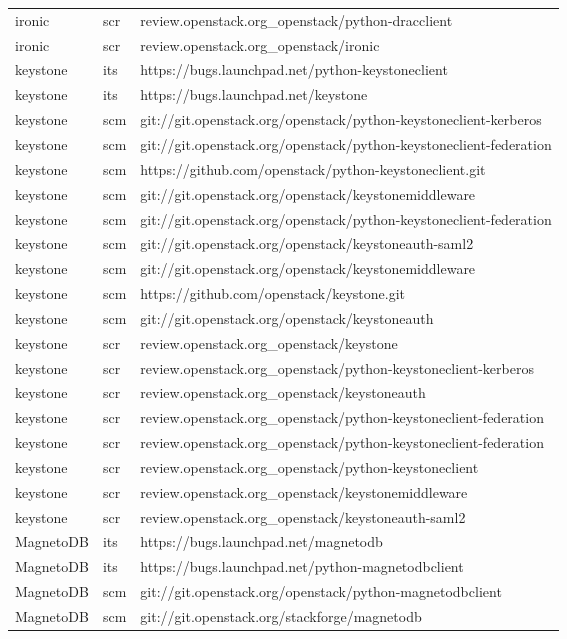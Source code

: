 \begin{center}
\begin{longtable}{|p{4cm}|p{1cm}|p{10cm}|}
ironic&scr&review.openstack.org\_openstack/python-dracclient\\ 
ironic&scr&review.openstack.org\_openstack/ironic\\ 
keystone&its&https://bugs.launchpad.net/python-keystoneclient\\ 
keystone&its&https://bugs.launchpad.net/keystone\\ 
keystone&scm&git://git.openstack.org/openstack/python-keystoneclient-kerberos\\ 
keystone&scm&git://git.openstack.org/openstack/python-keystoneclient-federation\\ 
keystone&scm&https://github.com/openstack/python-keystoneclient.git\\ 
keystone&scm&git://git.openstack.org/openstack/keystonemiddleware\\ 
keystone&scm&git://git.openstack.org/openstack/python-keystoneclient-federation\\ 
keystone&scm&git://git.openstack.org/openstack/keystoneauth-saml2\\ 
keystone&scm&git://git.openstack.org/openstack/keystonemiddleware\\ 
keystone&scm&https://github.com/openstack/keystone.git\\ 
keystone&scm&git://git.openstack.org/openstack/keystoneauth\\ 
keystone&scr&review.openstack.org\_openstack/keystone\\ 
keystone&scr&review.openstack.org\_openstack/python-keystoneclient-kerberos\\ 
keystone&scr&review.openstack.org\_openstack/keystoneauth\\ 
keystone&scr&review.openstack.org\_openstack/python-keystoneclient-federation\\ 
keystone&scr&review.openstack.org\_openstack/python-keystoneclient-federation\\ 
keystone&scr&review.openstack.org\_openstack/python-keystoneclient\\ 
keystone&scr&review.openstack.org\_openstack/keystonemiddleware\\ 
keystone&scr&review.openstack.org\_openstack/keystoneauth-saml2\\ 
MagnetoDB&its&https://bugs.launchpad.net/magnetodb\\ 
MagnetoDB&its&https://bugs.launchpad.net/python-magnetodbclient\\ 
MagnetoDB&scm&git://git.openstack.org/openstack/python-magnetodbclient\\ 
MagnetoDB&scm&git://git.openstack.org/stackforge/magnetodb\\ 

\end{longtable}
\end{center}
